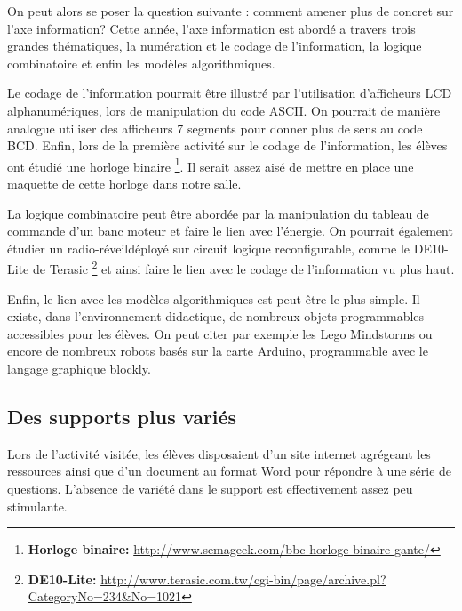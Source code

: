 \documentclass[pdftex,a4paper,12pt]{article}
\begin{document}
	On peut alors se poser la question suivante : comment amener plus de concret sur l'axe information?
	Cette année, l'axe information est abordé a travers trois grandes thématiques, la numération et le codage de l'information, la logique combinatoire 
	et enfin les modèles algorithmiques.

	Le codage de l'information pourrait être illustré par l'utilisation d'afficheurs LCD alphanumériques, lors de manipulation du code ASCII.
	On pourrait de manière analogue utiliser des afficheurs 7 segments pour donner plus de sens au code BCD.
	Enfin, lors de la première activité sur le codage de l'information, les élèves ont étudié une horloge binaire 
	\footnote{\textbf{Horloge binaire:} \url{http://www.semageek.com/bbc-horloge-binaire-gante/}}.
	Il serait assez aisé de mettre en place une maquette de cette horloge dans notre salle.

	La logique combinatoire peut être abordée par la manipulation du tableau de commande d'un banc moteur et faire le lien avec l'énergie.
	On pourrait également étudier un \og{}radio-réveil\fg{}déployé sur circuit logique reconfigurable, comme le DE10-Lite de Terasic 
	\footnote{\textbf{DE10-Lite:} \url{http://www.terasic.com.tw/cgi-bin/page/archive.pl?CategoryNo=234&No=1021}}
	et ainsi faire le lien avec le codage de l'information vu plus haut.

	Enfin, le lien avec les modèles algorithmiques est peut être le plus simple. 
	Il existe, dans l'environnement didactique, de nombreux objets programmables accessibles pour les élèves.
	On peut citer par exemple les Lego Mindstorms ou encore de nombreux robots basés sur la carte Arduino, programmable avec le langage graphique blockly.

	\subsection{Des supports plus variés}
	Lors de l'activité visitée, les élèves disposaient d'un site internet agrégeant les ressources ainsi que 
	d'un document au format Word pour répondre à une série de questions. 
	L'absence de variété dans le support est effectivement assez peu stimulante.
\end{document}

